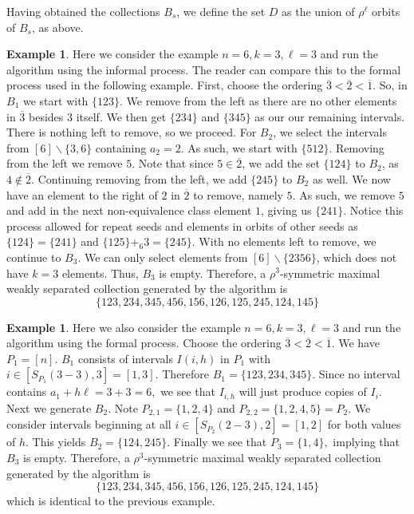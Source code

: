 \documentclass[11pt]{amsart}
\theoremstyle{plain}
\theoremstyle{definition}
\newtheorem{ex}[theorem]{Example}
\begin{document}
Having obtained the collections $B_s$, we define the set $D$ as the union of $\rho^\ell$ orbits of $B_s$, as above.
 

\begin{ex}
\label{algo}
Here we consider the example $n=6, k= 3 ,\ell = 3$ and run the algorithm using the informal process. The reader can compare this to the formal process used in the following example. First, choose the ordering $\overline{3}<\overline{2} < \overline{1}$. So, in $B_1$ we start with $\{123\}$. We remove from the left as there are no other elements in $\overline{3}$ besides $3$ itself. We then get $\{234\}$ and $\{345\}$ as our our remaining intervals. There is nothing left to remove, so we proceed. For $B_2$, we select the intervals from $[6]\backslash\{3,6\}$ containing $a_2=2.$ As such, we start with $\{512\}$. Removing from the left we remove $5$. Note that since $5 \in \overline{2}$, we add the set $\{124\}$ to $B_2$, as $4\not\in \overline{2}$. Continuing removing from the left, we add $\{245\}$ to $B_2$ as well. We now have an element to the right of $2$ in $\overline{2}$ to remove, namely $5$. As such, we remove $5$ and add in the next non-equivalence class element $1$, giving us $\{241\}.$ Notice this process allowed for repeat seeds and elements in orbits of other seeds as $\{124\}=\{241\}$ and $\{125\}+_6 3=\{245\}$. With no elements left to remove, we continue to $B_3$. We can only select elements from $[6]\backslash\{2356\}$, which does not have $k=3$ elements. Thus, $B_3$ is empty. Therefore, a $\rho^3$-symmetric maximal weakly separated collection generated by the algorithm is $$ \{123, 234,345, 456, 156, 126,125,245,124,145 \}$$
\end{ex}
\begin{ex}
\label{ex:formal_algo}
Here we also consider the example $n=6, k= 3 ,\ell = 3$ and run the algorithm using the formal process. Choose the ordering $\overline{3}<\overline{2} < \overline{1}$. We have $P_1=[n]$. $B_1$ consists of intervals $I(i, h)$ in $P_1$ with $i\in[S_{P_1}(3-3),3]=[1,3]$. Therefore $B_1=\{123,234,345\}$. Since no interval contains $a_1+ h\ell=3+3=6,$ we see that $I_{i, h}$ will just produce copies of $I_i$. Next we generate $B_2$. Note $P_{2,1}=\{1,2,4\}$ and $P_{2,2}=\{1,2,4,5\}=P_2$. We consider intervals beginning at all $i\in[S_{P_2}(2-3), 2]= [1,2]$ for both values of $h$. This yields $B_2=\{124, 245\}$. Finally we see that $P_3=\{1,4\},$ implying that $B_3$ is empty. Therefore, a $\rho^3$-symmetric maximal weakly separated collection generated by the algorithm is $$ \{123, 234, 345, 456, 156, 126, 125, 245, 124, 145 \}$$ which is identical to the previous example. 
\end{ex}
\end{document}

